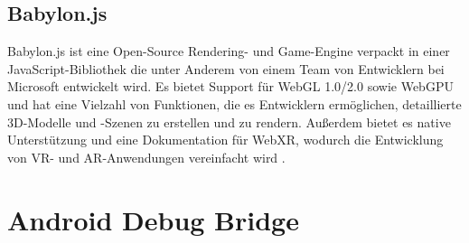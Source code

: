 \subsection{Babylon.js}

Babylon.js ist eine Open-Source Rendering- und Game-Engine verpackt in einer JavaScript-Bibliothek die unter Anderem von einem Team von Entwicklern bei Microsoft entwickelt wird.
Es bietet Support für WebGL 1.0/2.0 sowie WebGPU und hat eine Vielzahl von Funktionen, die es Entwicklern ermöglichen, detaillierte 3D-Modelle und -Szenen zu erstellen und zu rendern.
Außerdem bietet es native Unterstützung und eine Dokumentation für WebXR, wodurch die Entwicklung von VR- und AR-Anwendungen vereinfacht wird \autocite[][]{babylon-features}.


\section{Android Debug Bridge}